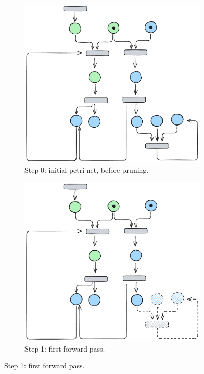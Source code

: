\begin{figure}[htbp]
	\centering
	
	\begin{subfigure}[b]{0.45\textwidth}
		\centering
		\includegraphics[width=\textwidth]{plots/bidirectional_pruning_step_a_updated.pdf}
		\caption{Step 0: initial petri net, before pruning.}
		\label{fig:step:a}
	\end{subfigure}\hfill
	\begin{subfigure}[b]{0.45\textwidth}
		\centering
		\includegraphics[width=\textwidth]{plots/bidirectional_pruning_step_b_updated.pdf}
		\caption{Step 1: first forward pass.}
		\label{fig:step:b}
	\end{subfigure}
	

\end{figure}
